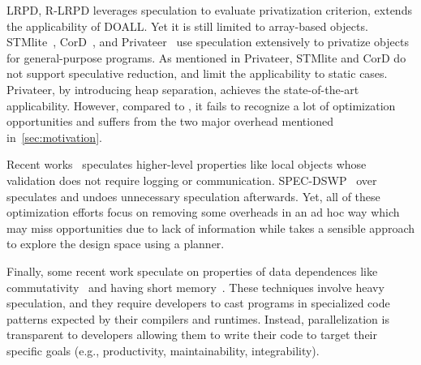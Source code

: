 LRPD\cite{rauchwerger:99:pds}, R-LRPD\cite{dang:02:ipdps} leverages
speculation to evaluate privatization criterion, extends the applicability
of DOALL. Yet it is still limited to array-based objects.
STMlite~\cite{mehrara:09:stmlite}, CorD~\cite{tian:10:pldi}, and
Privateer~\cite{johnson:12:pldi} use speculation extensively to privatize
objects for general-purpose programs. As mentioned in Privateer, STMlite
and CorD do not support speculative reduction, and limit the applicability
to static cases. Privateer, by introducing heap separation, achieves the
state-of-the-art applicability. However, compared to \namensp, it fails to
recognize a lot of optimization opportunities and suffers from the two
major overhead mentioned in~\cref{sec:motivation}.

Recent works~\cite{ctian:2008:micro,johnson:12:pldi,kim:12:cgo} speculates
higher-level properties like local objects whose validation does not
require logging or communication. SPEC-DSWP~\cite{vachharajani:07:pact}
over speculates and undoes unnecessary speculation afterwards. Yet, all of
these optimization efforts focus on removing some overheads in an ad hoc
way which may miss opportunities due to lack of information while
\name takes a sensible approach to explore the design space using a
planner.


Finally, some recent work speculate on properties of data dependences like
commutativity~\cite{kulkarni:07:pldi,Nguyen:2014:DGO:2541940.2541964} and
having short memory~\cite{Deiana:2018:UPN:3173162.3173181}. These
techniques involve heavy speculation, and they require developers to cast
programs in specialized code patterns expected by their compilers and
runtimes. Instead, \name parallelization is transparent to developers
allowing them to write their code to target their specific goals (e.g.,
productivity, maintainability, integrability).




